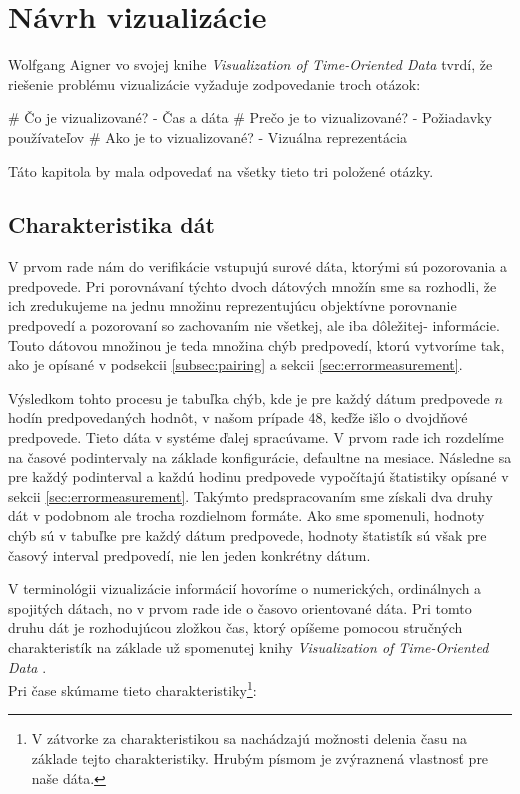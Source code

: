 \chapter{Návrh vizualizácie}
Wolfgang Aigner vo svojej knihe \textit{Visualization of Time-Oriented Data} \cite{TimeOrientedData} tvrdí, že riešenie problému vizualizácie vyžaduje zodpovedanie troch otázok: 
\begin{easylist}
	# Čo je vizualizované? - Čas a dáta
	# Prečo je to vizualizované? - Požiadavky používateľov
	# Ako je to vizualizované? - Vizuálna reprezentácia \\
\end{easylist}
\noindent Táto kapitola by mala odpovedať na všetky tieto tri položené otázky. 

\section{Charakteristika dát}
V prvom rade nám do verifikácie vstupujú surové dáta, ktorými sú pozorovania a predpovede. Pri porovnávaní týchto dvoch dátových množín sme sa rozhodli, že ich zredukujeme na jednu množinu reprezentujúcu objektívne porovnanie predpovedí a pozorovaní so zachovaním nie všetkej, ale iba dôležitej- informácie. Touto dátovou množinou je teda množina chýb predpovedí, ktorú vytvoríme tak, ako je opísané v podsekcii \ref{subsec:pairing} a sekcii \ref{sec:errormeasurement}.

Výsledkom tohto procesu je tabuľka chýb, kde je pre každý dátum predpovede $ n $ hodín predpovedaných hodnôt, v našom prípade 48, keďže išlo o dvojdňové predpovede. Tieto dáta v systéme ďalej spracúvame. V prvom rade ich rozdelíme na časové podintervaly na základe konfigurácie, defaultne na mesiace. Následne sa pre každý podinterval a každú hodinu predpovede vypočítajú štatistiky opísané v sekcii \ref{sec:errormeasurement}. Takýmto predspracovaním sme získali dva druhy dát v podobnom ale trocha rozdielnom formáte. Ako sme spomenuli, hodnoty chýb sú v tabuľke pre každý dátum predpovede, hodnoty štatistík sú však pre časový interval predpovedí, nie len jeden konkrétny dátum.

V terminológii vizualizácie informácií hovoríme o numerických, ordinálnych a spojitých dátach, no v prvom rade ide o časovo orientované dáta. Pri tomto druhu dát je rozhodujúcou zložkou čas, ktorý opíšeme pomocou stručných charakteristík na základe už spomenutej knihy \textit{Visualization of Time-Oriented Data} \cite{TimeOrientedData}. \\
Pri čase skúmame tieto charakteristiky\footnote{V zátvorke za charakteristikou sa nachádzajú možnosti delenia času na základe tejto charakteristiky. Hrubým písmom je zvýraznená vlastnosť pre naše dáta.}: 

